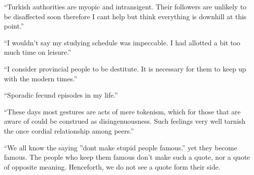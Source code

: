 \documentclass[12pt, a4paper]{ximera}
\begin{document}
``Turkish authorities are myopic and intransigent. Their followers are unlikely to be disaffected soon therefore I cant help but think everything is downhill at this point.''

``I wouldn't say my studying schedule was impeccable. I had allotted a bit too much time on leisure.''

``I consider provincial people to be destitute. It is necessary for them to keep up with the modern times.''

``Sporadic fecund episodes in my life.''

``These days most gestures are acts of mere tokenism, which for those that are aware of could be construed as disingenuousness. Such feelings very well tarnish the once cordial relationship among peers.''

``We all know the saying ''dont make stupid people famous.'' yet they become famous. The people who keep them famous don't make such a quote, nor a quote of opposite meaning. Henceforth, we do not see a quote form their side. 
\end{document}
